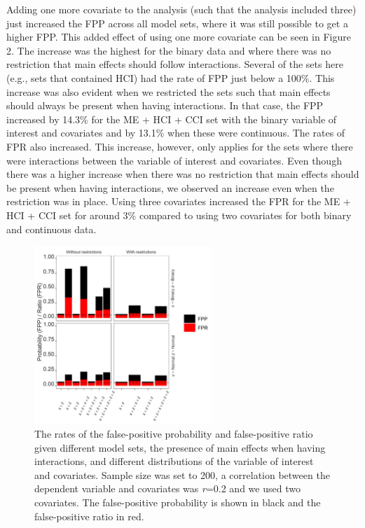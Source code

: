 Adding one more covariate to the analysis (such that the analysis included three) just increased the FPP across all model sets, where it was still possible to get a higher FPP. This added effect of using one more covariate can be seen in Figure 2. The increase was the highest for the binary data and where there was no restriction that main effects should follow interactions. Several of the sets here (e.g., sets that contained HCI) had the rate of FPP just below a 100\%. This increase was also evident when we restricted the sets such that main effects should always be present when having interactions. In that case, the FPP increased by 14.3\% for the ME + HCI + CCI set with the binary variable of interest and covariates and by 13.1\% when these were continuous. The rates of FPR also increased. This increase, however, only applies for the sets where there were interactions between the variable of interest and covariates. Even though there was a higher increase when there was no restriction that main effects should be present when having interactions, we observed an increase even when the restriction was in place. Using three covariates increased the FPR for the ME + HCI + CCI set for around 3\% compared to using two covariates for both binary and continuous data. 

\begin{figure}[hbt!]
\includegraphics[width=0.6\textwidth]{R/Analysis/Result/Figures/Figure1A.jpeg}
\centering
\caption{The rates of the false-positive probability and false-positive ratio given different model sets, the presence of main effects when having interactions, and different distributions of the variable of interest and covariates. Sample size was set to 200, a correlation between the dependent variable and covariates was \textit{r}=0.2 and we used two covariates. The false-positive probability is shown in black and the false-positive ratio in red.}
\label{fig:mainfigure}
\end{figure}

